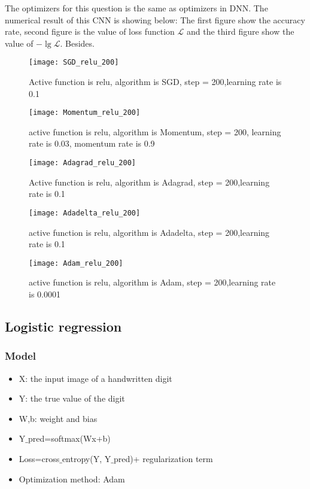 	The optimizers for this question is the same as optimizers in DNN. The numerical result of this CNN is showing below: The first figure show the accuracy rate, second figure is the value of loss function $\mathcal L$ and the third figure show the value of $-\lg \mathcal{L}$. Besides. 
	
\begin{figure}
	\texttt{[image: SGD\_relu\_200]}
	\caption{ Active function is relu, algorithm is SGD, step = 200,learning rate is 0.1}
	\texttt{[image: Momentum\_relu\_200]}
	\caption{active function is relu, algorithm is Momentum, step = 200, learning rate is 0.03, momentum rate is 0.9}
\end{figure}

\begin{figure}
	\texttt{[image: Adagrad\_relu\_200]}
	\caption{ Active function is relu, algorithm is Adagrad, step = 200,learning rate is 0.1}
	\texttt{[image: Adadelta\_relu\_200]}
	\caption{active function is relu, algorithm is Adadelta, step = 200,learning rate is 0.1}
\end{figure}
\begin{figure}
	
	\texttt{[image: Adam\_relu\_200]}
	\caption{active function is relu, algorithm is Adam, step = 200,learning rate is 0.0001 }
\end{figure}

\subsection{Logistic regression }
\subsubsection{Model}
\begin{itemize}
\item X: the input image of a handwritten digit
\item Y: the true value of the digit
\item W,b: weight and bias
\item Y$\_$pred=softmax(Wx+b)
\item Loss=cross$\_$entropy(Y, Y$\_$pred)+ regularization term
\item Optimization method: Adam
\end{itemize}

